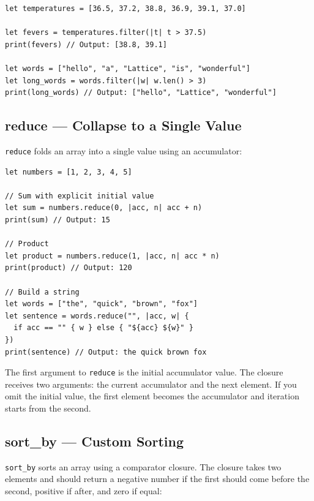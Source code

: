 \begin{lstlisting}[language=Lattice, caption={Filtering arrays}]
let temperatures = [36.5, 37.2, 38.8, 36.9, 39.1, 37.0]

let fevers = temperatures.filter(|t| t > 37.5)
print(fevers) // Output: [38.8, 39.1]

let words = ["hello", "a", "Lattice", "is", "wonderful"]
let long_words = words.filter(|w| w.len() > 3)
print(long_words) // Output: ["hello", "Lattice", "wonderful"]
\end{lstlisting}

\subsection{reduce --- Collapse to a Single Value}\label{sec:array-reduce}

\lstinline|reduce| folds an array into a single value using an accumulator:

\begin{lstlisting}[language=Lattice, caption={Reducing arrays}]
let numbers = [1, 2, 3, 4, 5]

// Sum with explicit initial value
let sum = numbers.reduce(0, |acc, n| acc + n)
print(sum) // Output: 15

// Product
let product = numbers.reduce(1, |acc, n| acc * n)
print(product) // Output: 120

// Build a string
let words = ["the", "quick", "brown", "fox"]
let sentence = words.reduce("", |acc, w| {
  if acc == "" { w } else { "${acc} ${w}" }
})
print(sentence) // Output: the quick brown fox
\end{lstlisting}

The first argument to \lstinline|reduce| is the initial accumulator value. The closure receives two arguments: the current accumulator and the next element. If you omit the initial value, the first element becomes the accumulator and iteration starts from the second.

\subsection{sort\_by --- Custom Sorting}\label{sec:array-sort-by}

\lstinline|sort_by| sorts an array using a comparator closure. The closure takes two elements and should return a negative number if the first should come before the second, positive if after, and zero if equal:

